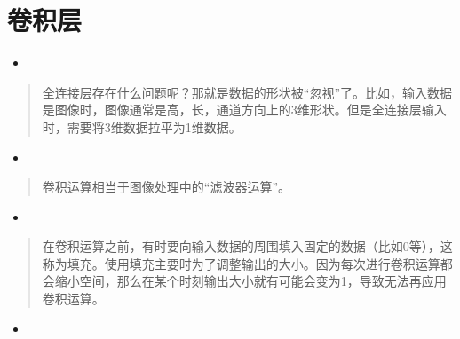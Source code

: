 \documentclass[letterpaper,10pt,english]{sphinxmanual}
\begin{document}
\section{卷积层}
\label{\detokenize{_u5377_u79ef_u795e_u7ecf_u7f51_u7edc:id3}}\begin{itemize}
\item {} 

\end{itemize}
\begin{quote}

全连接层存在什么问题呢？那就是数据的形状被“忽视”了。比如，输入数据是图像时，图像通常是高，长，通道方向上的3维形状。但是全连接层输入时，需要将3维数据拉平为1维数据。
\end{quote}
\begin{itemize}
\item {} 

\end{itemize}
\begin{quote}

卷积运算相当于图像处理中的“滤波器运算”。


\end{quote}
\begin{itemize}
\item {} 

\end{itemize}
\begin{quote}

在卷积运算之前，有时要向输入数据的周围填入固定的数据（比如0等），这称为填充。使用填充主要时为了调整输出的大小。因为每次进行卷积运算都会缩小空间，那么在某个时刻输出大小就有可能会变为1，导致无法再应用卷积运算。

\end{quote}
\begin{itemize}
\item {} 

\end{itemize}
\end{document}

